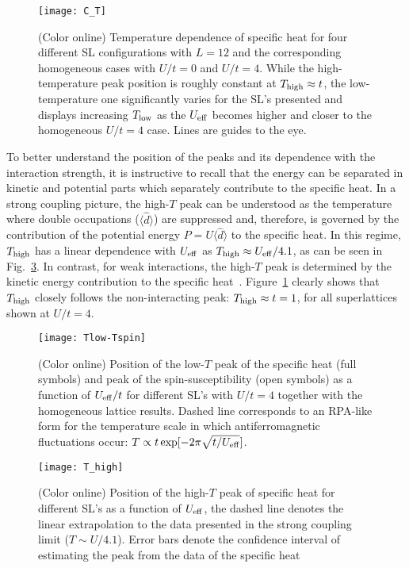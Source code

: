 \documentclass[aps,pra,reprint,twocolumn,showpacs,longbibliography,superscriptaddress]{revtex4-1}
\begin{document}
\begin{figure}[!tb] %
  \texttt{[image: C\_T]}
 \caption{(Color online) Temperature dependence of specific heat for four different SL configurations with $L=12$ and the corresponding homogeneous cases with $U/t=0$ and $U/t=4$. While the high-temperature peak position is roughly constant at $T_{\rm high}\approx t$, the low-temperature one significantly varies for the SL's presented and displays increasing $T_{\rm low}$ as the $U_{\rm eff}$ becomes higher and closer to the homogeneous $U/t=4$ case. Lines are guides to the eye.}
 \label{fig:C_T}
\end{figure}

To better understand the position of the peaks and its dependence with the interaction strength, it is instructive to recall that the energy can be separated in kinetic and potential parts which separately contribute to the specific heat. In a strong coupling picture, the high-$T$ peak can be understood as the temperature where double occupations ($\langle \hat d\rangle $) are suppressed and, therefore, is governed by the contribution of the potential energy $P= U \langle \hat d \rangle$ to the specific heat.  In this regime, $T_{\rm high}$ has a linear dependence with $U_{\rm eff}$ as $T_{\rm high}\approx U_{\rm eff}/4.1$, as can be seen in  Fig.~\ref{fig:T_high}. In contrast, for weak interactions, the high-$T$ peak is determined by the kinetic energy contribution to the specific heat~\cite{Paiva01}. Figure~\ref{fig:C_T} clearly shows that  $T_{\rm high}$ closely follows the non-interacting peak: $T_{\rm high}\approx t=1$, for all superlattices shown at $U/t=4$. 

\begin{figure}[!tb] %
  \texttt{[image: Tlow-Tspin]}
 \caption{(Color online) Position of the low-$T$ peak of the specific heat (full symbols) and peak of the spin-susceptibility (open symbols) as a function of $U_{\rm eff}/t$ for different SL's with $U/t=4$ together with the homogeneous lattice results. Dashed line corresponds to an RPA-like form for the temperature scale in which antiferromagnetic fluctuations occur: $T \propto t \exp[-2\pi \sqrt{t/U_{\rm eff}}]$.
 }
 \label{fig:Tlow-Tspin}
\end{figure}

\begin{figure}[!tb] %
  \texttt{[image: T\_high]}
 \caption{(Color online) Position of the high-$T$ peak of specific heat for different SL's as a function of $U_{\rm eff}$, the dashed line denotes the linear extrapolation to the data presented in the strong coupling limit ($T\sim U/4.1$). Error bars denote the confidence interval of estimating the peak from the data of the specific heat}
 \label{fig:T_high}
\end{figure}
\end{document}

